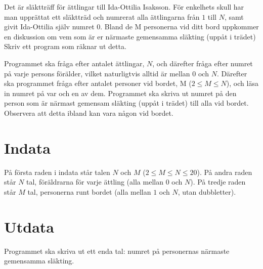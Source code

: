 Det är släktträff för ättlingar till Ida-Ottilia Isaksson.
För enkelhets skull har man upprättat ett släktträd och numrerat alla ättlingarna från $1$ till $N$, samt givit Ida-Ottilia själv numret $0$.
Bland de M personerna vid ditt bord uppkommer en diskussion om vem som är er närmaste gemensamma släkting (uppåt i trädet)
Skriv ett program som räknar ut detta.

Programmet ska fråga efter antalet ättlingar, $N$, och därefter fråga efter numret på varje persons förälder, vilket naturligtvis alltid är mellan $0$ och $N$.
Därefter ska programmet fråga efter antalet personer vid bordet, M ($2 \le M \le N$), och läsa in numret på var och en av dem.
Programmet ska skriva ut numret på den person som är närmast gemensam släkting (uppåt i trädet) till alla vid bordet.
Observera att detta ibland kan vara någon vid bordet.

\section*{Indata}
På första raden i indata står talen $N$ och $M$ ($2 \le M \le N \le 20$).
På andra raden står $N$ tal, föräldrarna för varje ättling (alla mellan $0$ och $N$).
På tredje raden står $M$ tal, personerna runt bordet (alla mellan $1$ och $N$, utan dubbletter).

\section*{Utdata}
Programmet ska skriva ut ett enda tal: numret på personernas närmaste gemensamma släkting.
